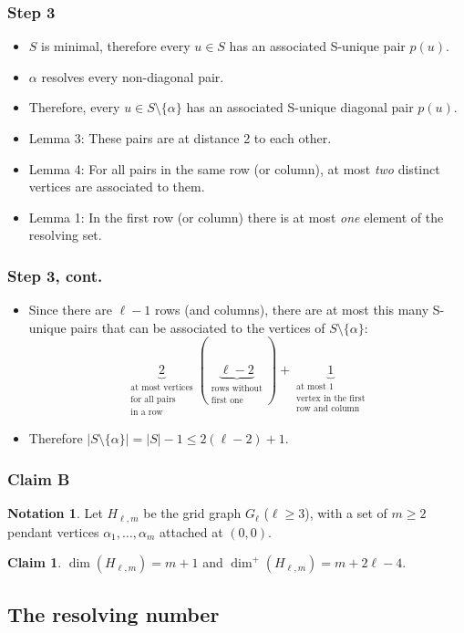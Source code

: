\documentclass[hyperref={pdfpagelabels=false}]{beamer}
\theoremstyle{definition}
\newtheorem{ntn}{Notation}
\theoremstyle{theorem}
\newtheorem{clm}{Claim}
\begin{document}
\begin{frame}
	\frametitle{Step 3}
	\begin{itemize}
		\item $S$ is minimal, therefore every $u \in S$ has an associated S-unique pair $p(u)$.
		\item $\alpha$ resolves every non-diagonal pair.
		\item Therefore, every $u \in S \setminus \{\alpha\}$ has an associated S-unique diagonal pair $p(u)$.
		\item Lemma 3: These pairs are at distance 2 to each other.
		\item Lemma 4: For all pairs in the same row (or column), at most \emph{two} distinct vertices are associated to them.
		\item Lemma 1: In the first row (or column) there is at most \emph{one} element of the resolving set. %
	\end{itemize}
\end{frame}
\begin{frame}
	\frametitle{Step 3, cont.}
	\begin{itemize}
		\item Since there are $\ell - 1$ rows (and columns), there are at most this many S-unique pairs that can be associated to the vertices of $S \setminus \{\alpha\}$:
			\[\underbrace{2}_{\substack{\text{at most vertices}\\\text{for all pairs}\\\text{in a row}}}
			(\underbrace{\ell - 2}_{\substack{\text{rows without}\\\text{first one}}})
		+ \underbrace{1}_{\substack{\text{at most 1}\\\text{vertex in the first}\\\text{row and column}}}\]
		\item Therefore $|S \setminus \{\alpha\}| = |S| - 1 \leq 2(\ell - 2) + 1$.
	\end{itemize}
\end{frame}
\begin{frame}
	\frametitle{Claim B}
	\begin{ntn}
		Let $H_{\ell,m}$ be the grid graph $G_\ell$ ($\ell \geq 3$), with a set of $m \geq 2$ pendant vertices $\alpha_1, \dotsc, \alpha_m$ attached at $(0,0)$.
	\end{ntn}
	\begin{clm}
		$\dim(H_{\ell,m}) = m + 1$ and $\dim^+(H_{\ell,m}) = m + 2\ell - 4$.
	\end{clm}
\end{frame}
\subsection{The resolving number}
\end{document}
